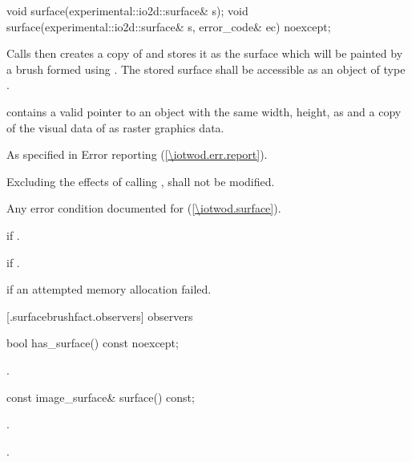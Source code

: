 \begin{itemdecl}
    void surface(experimental::io2d::surface& s);
    void surface(experimental::io2d::surface& s, error_code& ec) noexcept;
\end{itemdecl}
\begin{itemdescr}
	\pnum
	\effects
	Calls  then creates a copy of  and stores it as the surface which will be painted by a brush formed using . The stored surface shall be accessible as an object of type .
	
	\pnum
	\postconditions
	 contains a valid pointer to an  object with the same width, height,  as  and a copy of the visual data of  as raster graphics data.

	\pnum
	\throws
	As specified in Error reporting (\ref{\iotwod.err.report}).

	\pnum
	\remarks
	Excluding the effects of calling ,  shall not be modified.
	
	\pnum
	\errors
	Any error condition documented for  (\ref{\iotwod.surface}).
	
	\pnum
	 if .
	
	\pnum
	 if .

	\pnum
	 if an attempted memory allocation failed.

\end{itemdescr}

 [\iotwod.surfacebrushfact.observers]{ observers}

\begin{itemdecl}
    bool has_surface() const noexcept;
\end{itemdecl}
\begin{itemdescr}
	\pnum
	\returns
	.

\end{itemdescr}

\begin{itemdecl}
    const image_surface& surface() const;
\end{itemdecl}
\begin{itemdescr}
	\pnum
	\preconditions
	.
	
	\pnum
	\returns
	.
	
\end{itemdescr}
